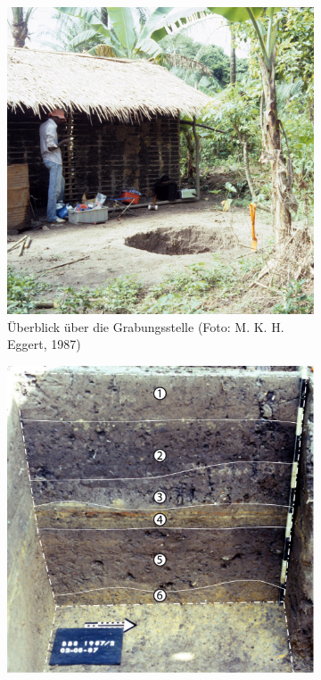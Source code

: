 \begin{figure}[!tb]
	\centering
	\begin{subfigure}[b]{\columnwidth}
		\includegraphics[width = \textwidth]{fig/BBS87-2_E87-02-17.jpg}
		\caption{Überblick über die Grabungsstelle (Foto: M. K. H. Eggert, 1987)}
		\label{fig:BBS87-2_GrubeVorGrabung}
	\end{subfigure}\hfill
	\begin{subfigure}[b]{\columnwidth}
		\includegraphics[width = \textwidth]{fig/BBS87-2_H87-01-5.pdf}

\end{subfigure}
\end{figure}
